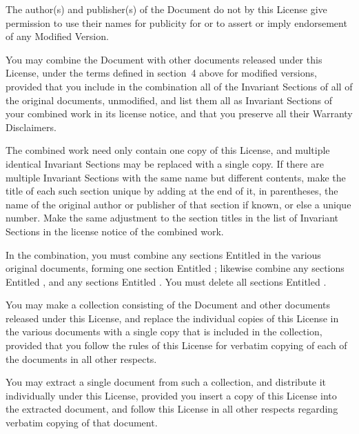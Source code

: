 The author(s) and publisher(s) of the Document do not by this License
give permission to use their names for publicity for or to assert or
imply endorsement of any Modified Version.


\stopalignment


You may combine the Document with other documents released under this
License, under the terms defined in section~4 above for modified
versions, provided that you include in the combination all of the
Invariant Sections of all of the original documents, unmodified, and
list them all as Invariant Sections of your combined work in its
license notice, and that you preserve all their Warranty Disclaimers.

The combined work need only contain one copy of this License, and
multiple identical Invariant Sections may be replaced with a single
copy.  If there are multiple Invariant Sections with the same name but
different contents, make the title of each such section unique by
adding at the end of it, in parentheses, the name of the original
author or publisher of that section if known, or else a unique number.
Make the same adjustment to the section titles in the list of
Invariant Sections in the license notice of the combined work.

In the combination, you must combine any sections Entitled 
in the various original documents, forming one section Entitled
; likewise combine any sections Entitled ,
and any sections Entitled .  You must delete all sections
Entitled .

\stopalignment

You may make a collection consisting of the Document and other documents
released under this License, and replace the individual copies of this
License in the various documents with a single copy that is included in
the collection, provided that you follow the rules of this License for
verbatim copying of each of the documents in all other respects.

You may extract a single document from such a collection, and distribute
it individually under this License, provided you insert a copy of this
License into the extracted document, and follow this License in all
other respects regarding verbatim copying of that document.


